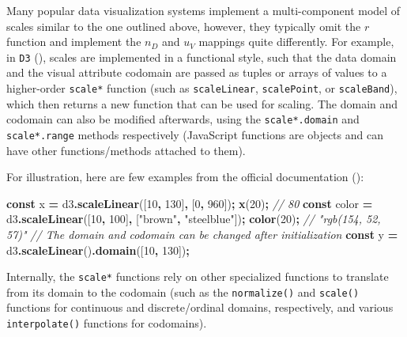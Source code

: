 \documentclass[
]{book}
\newenvironment{Shaded}{\begin{snugshade}}{\end{snugshade}}
\newcommand{\CommentTok}[1]{\textcolor[rgb]{0.56,0.35,0.01}{\textit{#1}}}
\newcommand{\DecValTok}[1]{\textcolor[rgb]{0.00,0.00,0.81}{#1}}
\newcommand{\FunctionTok}[1]{\textcolor[rgb]{0.13,0.29,0.53}{\textbf{#1}}}
\newcommand{\KeywordTok}[1]{\textcolor[rgb]{0.13,0.29,0.53}{\textbf{#1}}}
\newcommand{\NormalTok}[1]{#1}
\newcommand{\OperatorTok}[1]{\textcolor[rgb]{0.81,0.36,0.00}{\textbf{#1}}}
\newcommand{\StringTok}[1]{\textcolor[rgb]{0.31,0.60,0.02}{#1}}
\theoremstyle{definition}
\theoremstyle{definition}
\theoremstyle{definition}
\theoremstyle{definition}
\theoremstyle{remark}
\begin{document}
Many popular data visualization systems implement a multi-component model of scales similar to the one outlined above, however, they typically omit the \(r\) function and implement the \(n_D\) and \(u_V\) mappings quite differently. For example, in \texttt{D3} (), scales are implemented in a functional style, such that the data domain and the visual attribute codomain are passed as tuples or arrays of values to a higher-order \texttt{scale*} function (such as \texttt{scaleLinear}, \texttt{scalePoint}, or \texttt{scaleBand}), which then returns a new function that can be used for scaling. The domain and codomain can also be modified afterwards, using the \texttt{scale*.domain} and \texttt{scale*.range} methods respectively (JavaScript functions are objects and can have other functions/methods attached to them).

For illustration, here are few examples from the official documentation ():

\begin{Shaded}
\begin{Highlighting}[]
\KeywordTok{const}\NormalTok{ x }\OperatorTok{=}\NormalTok{ d3}\OperatorTok{.}\FunctionTok{scaleLinear}\NormalTok{([}\DecValTok{10}\OperatorTok{,} \DecValTok{130}\NormalTok{]}\OperatorTok{,}\NormalTok{ [}\DecValTok{0}\OperatorTok{,} \DecValTok{960}\NormalTok{])}\OperatorTok{;}
\FunctionTok{x}\NormalTok{(}\DecValTok{20}\NormalTok{)}\OperatorTok{;} \CommentTok{// 80}
\KeywordTok{const}\NormalTok{ color }\OperatorTok{=}\NormalTok{ d3}\OperatorTok{.}\FunctionTok{scaleLinear}\NormalTok{([}\DecValTok{10}\OperatorTok{,} \DecValTok{100}\NormalTok{]}\OperatorTok{,}\NormalTok{ [}\StringTok{"brown"}\OperatorTok{,} \StringTok{"steelblue"}\NormalTok{])}\OperatorTok{;}
\FunctionTok{color}\NormalTok{(}\DecValTok{20}\NormalTok{)}\OperatorTok{;} \CommentTok{// "rgb(154, 52, 57)"}
\CommentTok{// The domain and codomain can be changed after initialization}
\KeywordTok{const}\NormalTok{ y }\OperatorTok{=}\NormalTok{ d3}\OperatorTok{.}\FunctionTok{scaleLinear}\NormalTok{()}\OperatorTok{.}\FunctionTok{domain}\NormalTok{([}\DecValTok{10}\OperatorTok{,} \DecValTok{130}\NormalTok{])}\OperatorTok{;} 
\end{Highlighting}
\end{Shaded}

Internally, the \texttt{scale*} functions rely on other specialized functions to translate from its domain to the codomain (such as the \texttt{normalize()} and \texttt{scale()} functions for continuous and discrete/ordinal domains, respectively, and various \texttt{interpolate()} functions for codomains).
\end{document}
